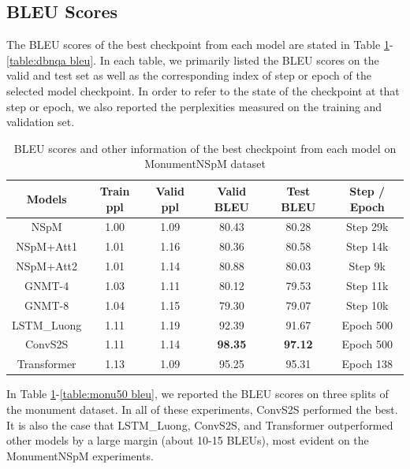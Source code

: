 \subsection{BLEU Scores}

The BLEU scores of the best checkpoint from each model are stated in Table \ref{table:monu600 bleu}-\ref{table:dbnqa bleu}. In each table, we primarily listed the BLEU scores on the valid and test set as well as the corresponding index of step or epoch of the selected model checkpoint. In order to refer to the state of the checkpoint at that step or epoch, we also reported the perplexities measured on the training and validation set.

\begin{table}[h]
\centering
\caption{BLEU scores and other information of the best checkpoint from each model on MonumentNSpM dataset}
\label{table:monu600 bleu}
\begin{tabular}{c|c|c|c|c|c}
Models & Train ppl & Valid ppl & \textbf{Valid BLEU} & \textbf{Test BLEU} & Step / Epoch \\
\hline
NSpM & 1.00 & 1.09 & 80.43 & 80.28 & Step 29k \\
NSpM+Att1 & 1.01 & 1.16 & 80.36 & 80.58 & Step 14k \\
NSpM+Att2 & 1.01 & 1.14 & 80.88 & 80.03 & Step 9k \\
GNMT-4 & 1.03 & 1.11 & 80.12 & 79.53 & Step 11k \\
GNMT-8 & 1.04 & 1.15 & 79.30 & 79.07 & Step 10k \\
LSTM\_Luong & 1.11 & 1.19 & 92.39 & 91.67 & Epoch 500 \\
ConvS2S & 1.11 & 1.14 & \textbf{98.35} & \textbf{97.12} & Epoch 500 \\
Transformer & 1.13 & 1.09 & 95.25 & 95.31 & Epoch 138 \\
\end{tabular}
\end{table}

In Table \ref{table:monu600 bleu}-\ref{table:monu50 bleu}, we reported the BLEU scores on three splits of the monument dataset. In all of these experiments, ConvS2S performed the best. It is also the case that LSTM\_Luong, ConvS2S, and Transformer outperformed other models by a large margin (about 10-15 BLEUs), most evident on the MonumentNSpM experiments.

